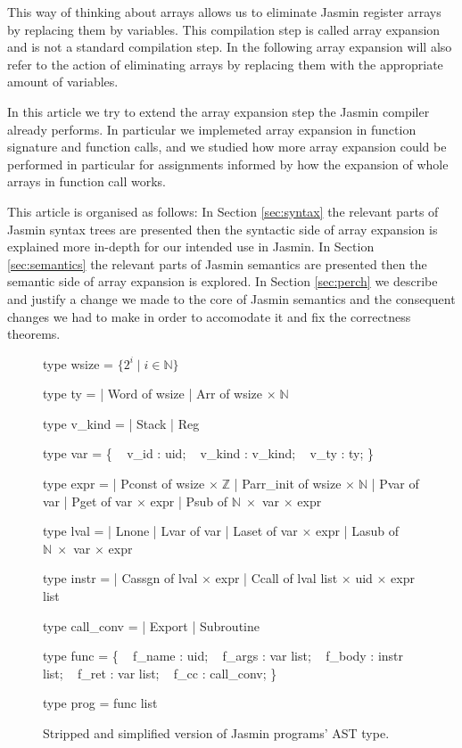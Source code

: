 \documentclass{article}
\newcommand\setZ{\mathbb{Z}}
\newcommand\setN{\mathbb{N}}
\begin{document}
This way of thinking about arrays allows us to eliminate Jasmin register arrays
by replacing them by variables. This compilation step is called array expansion
and is not a standard compilation step. In the following array expansion will
also refer to the action of eliminating arrays by replacing them with the
appropriate amount of variables.

\medskip

In this article we try to extend the array expansion step the Jasmin compiler
already performs. In particular we implemeted array expansion in function
signature and function calls, and we studied how more array expansion could be
performed in particular for assignments informed by how the expansion of whole
arrays in function call works.


\medskip

This article is organised as follows:
In Section \ref{sec:syntax} the relevant parts of Jasmin syntax trees are
presented then the syntactic side of array expansion is explained more in-depth
for our intended use in Jasmin.
In Section \ref{sec:semantics} the relevant parts of Jasmin semantics are
presented then the semantic side of array expansion is explored.
In Section \ref{sec:perch} we describe and justify a change we made to the core
of Jasmin semantics and the consequent changes we had to make in order to
accomodate it and fix the correctness theorems.

\begin{figure}[!b]
\obeylines\obeyspaces\ttfamily%
type wsize = \(\{ 2^i \mid i \in \setN \}\)

type ty =
| Word of wsize
| Arr  of wsize \(\times\;\setN\)

type v\_kind =
| Stack
| Reg

type var = \{
~ v\_id   : uid;
~ v\_kind : v\_kind;
~ v\_ty   : ty;
\}

type expr =
| Pconst    of wsize \(\times\;\setZ\)
| Parr\_init of wsize \(\times\;\setN\)
| Pvar      of var
| Pget      of var \(\times\) expr
| Psub      of \(\setN\;\times\) var \(\times\) expr

type lval =
| Lnone
| Lvar  of var
| Laset of var \(\times\) expr
| Lasub of \(\setN\;\times\) var \(\times\) expr

type instr =
| Cassgn of lval \(\times\) expr
| Ccall  of lval list \(\times\) uid \(\times\) expr list

type call\_conv =
| Export
| Subroutine

type func = \{
~ f\_name : uid;
~ f\_args : var list;
~ f\_body : instr list;
~ f\_ret  : var list;
~ f\_cc   : call\_conv;
\}

type prog = func list
\normalfont%
\caption{Stripped and simplified version of Jasmin programs' AST type.}\label{fig:types}
\end{figure}
\end{document}
